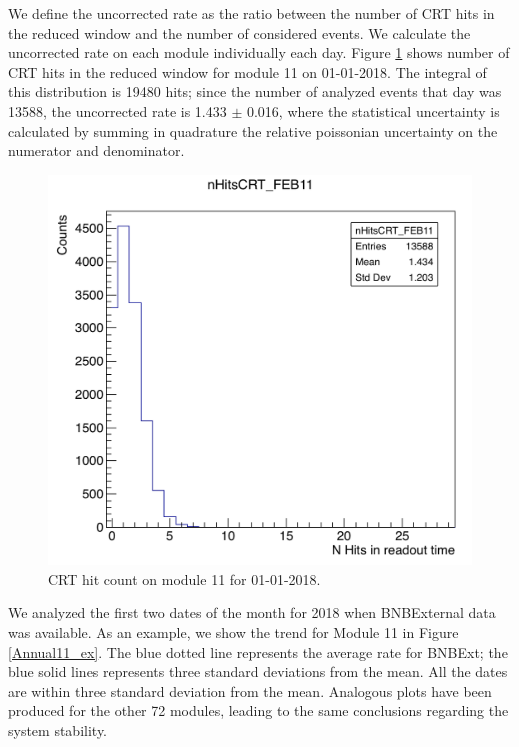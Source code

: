 We define the uncorrected rate as the ratio between the number of CRT hits in the reduced window and the number of considered events. We calculate the uncorrected rate on each module individually each day. 
Figure \ref{fig:count} shows number of CRT hits in the reduced window for module 11 on 01-01-2018. The integral of this distribution is 19480 hits; since the number of analyzed events that day was 13588, the uncorrected rate is 1.433 $\pm$ 0.016, where the statistical uncertainty is calculated by summing in quadrature the relative poissonian uncertainty on the numerator and denominator.

\begin{figure}[h!]
\centering
\includegraphics[scale=0.4]{images/count.png}
\caption{CRT hit count on module 11 for 01-01-2018.}
\label{fig:count}
\end{figure}
\clearpage


We analyzed the first two dates of the month for 2018 when BNBExternal data was available. 
As an example, we show the trend for Module 11 in Figure \ref{Annual11_ex}. The blue dotted line represents the average rate for BNBExt; the blue solid lines represents three standard deviations from the mean. All the dates are within three standard deviation from the mean. Analogous plots have been produced for the other 72 modules, leading to the same conclusions regarding the system stability.

